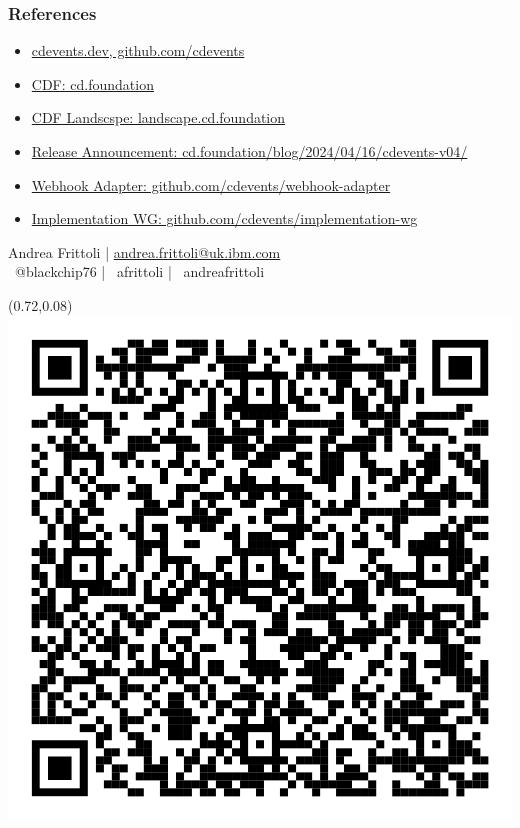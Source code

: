 \documentclass[aspectratio=169,11pt,hyperref={colorlinks=true}]{beamer}
\begin{document}
\begin{blackframe}
  \frametitle{References}
  \begin{itemize}
    \item \href{https://cdevents.dev}{cdevents.dev, github.com/cdevents}
    \item \href{https://cd.foundation}{CDF: cd.foundation}
    \item \href{https://landscape.cd.foundation}{CDF Landscspe: landscape.cd.foundation}
  \end{itemize}
  \vspace{0.06\textheight}
  \begin{itemize}
    \item \href{https://cd.foundation/blog/2024/04/16/cdevents-v04/}{Release Announcement: cd.foundation/blog/2024/04/16/cdevents-v04/}
    \item \href{https://github.com/cdevents/webhook-adapter/}{Webhook Adapter: github.com/cdevents/webhook-adapter}
    \item \href{https://github.com/cdevents/implementation-wg}{Implementation WG: github.com/cdevents/implementation-wg}
  \end{itemize}
  \vspace{0.1\textheight}
  Andrea Frittoli | \href{mailto:andrea.frittoli@uk.ibm.com}{andrea.frittoli@uk.ibm.com} \\
  \faTwitter ~@blackchip76 | \faGithub ~afrittoli | \faLinkedin ~andreafrittoli
  \begin{textblock*}{0.20\paperwidth}(0.72\paperwidth,0.08\paperheight)
    \includegraphics[width=0.20\paperwidth]{img/lfms_2024_slides_qr.png}
  \end{textblock*}
\end{blackframe}
\end{document}
